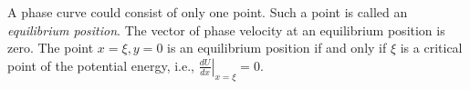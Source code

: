 A phase curve could consist of only one point. Such a point is called an \textit{equilibrium position}.
The vector of phase velocity at an equilibrium position is zero.
The point $x = \xi, y = 0$ is an equilibrium position if and only if $\xi$ is a critical point of the potential energy, i.e., $\left.\frac{dU}{dx}\right|_{x=\xi} = 0$.
